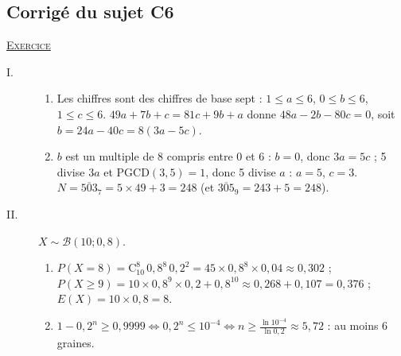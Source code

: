 \begin{corrige}
\subsection{Corrig\'e du sujet C6}
\noindent \underline{\textsc{Exercice}}
\begin{description}
\item[I.] \begin{enumerate}
      \item Les chiffres sont des chiffres de base sept : $1 \leq a \leq 6$, $0 \leq b \leq 6$, $1 \leq c \leq 6$.
            $49a + 7b + c = 81c + 9b + a$ donne $48a - 2b - 80c = 0$, soit $b = 24a - 40c = 8(3a - 5c)$.
      \item $b$ est un multiple de 8 compris entre 0 et 6 : $b = 0$, donc $3a = 5c$ ; 5 divise $3a$ et $\mathrm{PGCD}(3,5) = 1$, donc 5 divise $a$ :
            $a = 5$, $c = 3$. $N = \overline{503}_7 = 5 \times 49 + 3 = 248$ (et $\overline{305}_9 = 243 + 5 = 248$).
      \end{enumerate}
\item[II.] $X \sim \mathscr{B}(10 ; 0{,}8)$.
      \begin{enumerate}
      \item $P(X = 8) = \mathrm{C}_{10}^8\, 0{,}8^8\, 0{,}2^2 = 45 \times 0{,}8^8 \times 0{,}04 \approx 0{,}302$ ;
            $P(X \geq 9) = 10 \times 0{,}8^9 \times 0{,}2 + 0{,}8^{10} \approx 0{,}268 + 0{,}107 = 0{,}376$ ; $E(X) = 10 \times 0{,}8 = 8$.
      \item $1 - 0{,}2^n \geq 0{,}9999 \iff 0{,}2^n \leq 10^{-4} \iff n \geq \frac{\ln 10^{-4}}{\ln 0{,}2} \approx 5{,}72$ : au moins 6 graines.
      \end{enumerate}
\end{description}


\end{corrige}
